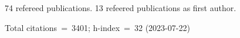 74 refereed publications. 13 refeered publications as first author.

Total citations~=~3401; h-index~=~32 (2023-07-22)